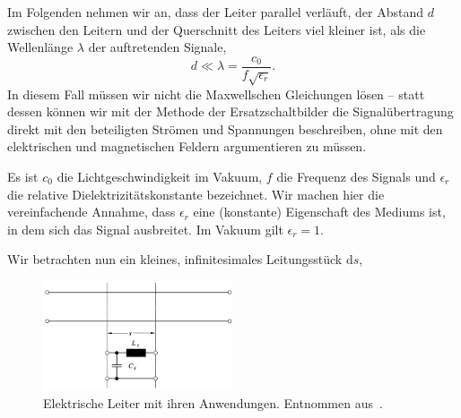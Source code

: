 \documentclass[paper=a4, parskip=half-, ngerman, fontsize=11pt]{scrreprt}
\begin{document}
Im Folgenden nehmen wir an, dass der Leiter parallel verläuft, der Abstand $d$ zwischen den Leitern und der Querschnitt
des Leiters viel kleiner ist, als die Wellenlänge $\lambda$ der auftretenden Signale,
\[ d \ll \lambda = \frac{c_{0}}{f \sqrt{\epsilon_{r}}}. \]
In diesem Fall müssen wir nicht die Maxwellschen Gleichungen
lösen -- statt dessen können wir mit der Methode der Ersatzschaltbilder die Signalübertragung direkt mit den
beteiligten Strömen und Spannungen beschreiben, ohne mit den elektrischen und magnetischen Feldern
argumentieren zu müssen.

Es ist $c_{0}$ die Lichtgeschwindigkeit im Vakuum, $f$ die Frequenz des Signals und $\epsilon_{r}$ die relative
Dielektrizitätskonstante bezeichnet. Wir machen hier die vereinfachende Annahme, dass $\epsilon_{r}$ eine (konstante)
Eigenschaft des Mediums ist, in dem sich das Signal ausbreitet. Im Vakuum gilt $\epsilon_{r} = 1$.




Wir betrachten nun ein kleines, infinitesimales Leitungsstück $\mathrm{d}s$,
\begin{figure}[!h]
    \begin{center}
        \includegraphics[width=0.5\textwidth]{images/Leitung1.png}
        \caption{Elektrische Leiter mit ihren Anwendungen. Entnommen aus~\cite{LeitungenUndFilter}.}
        \label{Leitung1}
    \end{center}
\end{figure}
\end{document}
